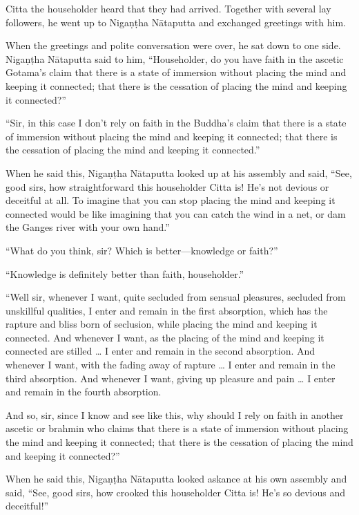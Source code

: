 \documentclass[12pt,openany]{book}%
\begin{document}
Citta the householder heard that they had arrived. Together with several lay followers, he went up to \textsanskrit{Nigaṇṭha} \textsanskrit{Nātaputta} and exchanged greetings with him. 

When the greetings and polite conversation were over, he sat down to one side. \textsanskrit{Nigaṇṭha} \textsanskrit{Nātaputta} said to him, “Householder, do you have faith in the ascetic Gotama’s claim that there is a state of immersion without placing the mind and keeping it connected; that there is the cessation of placing the mind and keeping it connected?” 

“Sir, in this case I don’t rely on faith in the Buddha’s claim that there is a state of immersion without placing the mind and keeping it connected; that there is the cessation of placing the mind and keeping it connected.” 

When he said this, \textsanskrit{Nigaṇṭha} \textsanskrit{Nātaputta} looked up at his assembly and said, “See, good sirs, how straightforward this householder Citta is! He’s not devious or deceitful at all. To imagine that you can stop placing the mind and keeping it connected would be like imagining that you can catch the wind in a net, or dam the Ganges river with your own hand.” 

“What do you think, sir? Which is better—knowledge or faith?” 

“Knowledge is definitely better than faith, householder.” 

“Well sir, whenever I want, quite secluded from sensual pleasures, secluded from unskillful qualities, I enter and remain in the first absorption, which has the rapture and bliss born of seclusion, while placing the mind and keeping it connected. And whenever I want, as the placing of the mind and keeping it connected are stilled … I enter and remain in the second absorption. And whenever I want, with the fading away of rapture … I enter and remain in the third absorption. And whenever I want, giving up pleasure and pain … I enter and remain in the fourth absorption. 

And so, sir, since I know and see like this, why should I rely on faith in another ascetic or brahmin who claims that there is a state of immersion without placing the mind and keeping it connected; that there is the cessation of placing the mind and keeping it connected?” 

When he said this, \textsanskrit{Nigaṇṭha} \textsanskrit{Nātaputta} looked askance at his own assembly and said, “See, good sirs, how crooked this householder Citta is! He’s so devious and deceitful!” 
\end{document}
